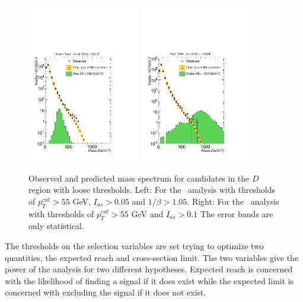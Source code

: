 \begin{figure}
 \begin{center}
  \includegraphics[clip=true, trim=0.0cm 0cm 2.8cm 0cm,width=0.44\textwidth]{figures/tkmu/RescaleNoRatio_Mass_8TeV_LooseNoSMMC}
  \includegraphics[clip=true, trim=0.0cm 0cm 2.8cm 0cm,width=0.44\textwidth]{figures/tkonly/RescaleNoRatio_Mass_8TeV_LooseNoSMMC}
 \end{center}
 \caption[Observed and predicted mass spectrum for candidates in the signal region with loose thresholds in the \tktof\ and \tkonly\ analyses.]
{Observed and predicted mass spectrum for candidates in the $D$ region with loose thresholds.
Left: For the \tktof\ analysis with thresholds of $p_T^{cut}>55$ GeV, $I_{as}>0.05$ and $1/\beta>1.05$.
Right: For the \tkonly\ analysis with thresholds of $p_T^{cut}>55$ GeV and $I_{as}>0.1$
The error bands are only statistical.}
\label{fig:MassDistribution}
\end{figure}

The thresholds on the selection variables are set trying to optimize two quantities, the expected reach and cross-section limit.
The two variables give the power of the analysis for two different hypotheses. Expected reach is concerned with the likelihood of finding a signal if it does exist while the
expected limit is concerned with excluding the signal if it does not exist.

